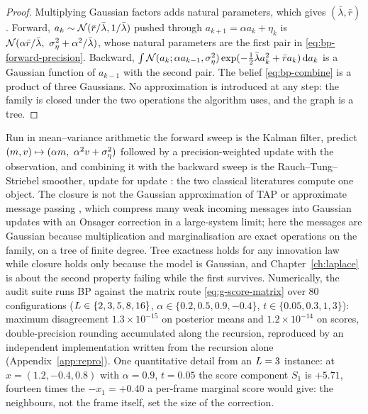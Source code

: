\begin{proof}
Multiplying Gaussian factors adds natural parameters, which gives
$(\bar\lambda, \bar r)$. Forward, $a_k \sim \mathcal{N}(\bar r/\bar\lambda, 1/\bar\lambda)$
pushed through $a_{k+1} = \alpha a_k + \eta_k$ is
$\mathcal{N}(\alpha\bar r/\bar\lambda,\ \sigma_\eta^2 + \alpha^2/\bar\lambda)$, whose natural
parameters are the first pair in \eqref{eq:bp-forward-precision}. Backward,
$\int \mathcal{N}(a_k; \alpha a_{k-1}, \sigma_\eta^2)\exp(-\tfrac12\bar\lambda a_k^2 + \bar r a_k)\,\mathrm{d} a_k$
is a Gaussian function of $a_{k-1}$ with the second pair. The belief
\eqref{eq:bp-combine} is a product of three Gaussians. No approximation is
introduced at any step: the family is closed under the two operations the
algorithm uses, and the graph is a tree.
\end{proof}

Run in mean--variance arithmetic the forward sweep is the Kalman filter,
predict $(m, v) \mapsto (\alpha m,\ \alpha^2 v + \ivar)$ followed by a
precision-weighted update with the observation, and combining it with the
backward sweep is the Rauch--Tung--Striebel smoother, update for update
\citep{kalman1960new, rauch1965maximum}: the two classical literatures
compute one object. The closure is not the Gaussian approximation of TAP or
approximate message passing \citep{thouless1977solution, donoho2009message},
which compress many weak incoming messages into Gaussian updates with an
Onsager correction in a large-system limit; here the messages are Gaussian
because multiplication and marginalisation are exact operations on the
family, on a tree of finite degree. Tree exactness holds for any innovation
law while closure holds only because the model is Gaussian, and
Chapter~\ref{ch:laplace} is about the second property failing while the first
survives. Numerically, the audit suite runs BP against the matrix route
\eqref{eq:g-score-matrix} over $80$ configurations
($L \in \{2,3,5,8,16\}$, $\alpha \in \{0.2, 0.5, 0.9, -0.4\}$,
$t \in \{0.05, 0.3, 1, 3\}$): maximum disagreement $1.3 \times 10^{-15}$ on
posterior means and $1.2 \times 10^{-14}$ on scores, double-precision
rounding accumulated along the recursion, reproduced by an independent
implementation written from the recursion alone (Appendix~\ref{app:repro}).
One quantitative detail from an $L = 3$ instance: at
$x = (1.2, -0.4, 0.8)$ with $\alpha = 0.9$, $t = 0.05$ the score component
$S_1$ is $+5.71$, fourteen times the $-x_1 = +0.40$ a per-frame marginal
score would give: the neighbours, not the frame itself, set the size of the
correction.

